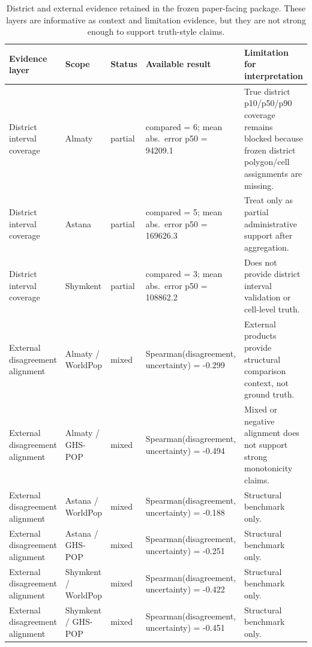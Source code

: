 \begin{table}[H]
\centering
\scriptsize
\caption{District and external evidence retained in the frozen paper-facing package. These layers are informative as context and limitation evidence, but they are not strong enough to support truth-style claims.}
\label{tab:district-external}
\begin{tabular}{p{2.6cm}p{2.2cm}p{1.2cm}p{3.1cm}p{5.1cm}}
\toprule
Evidence layer & Scope & Status & Available result & Limitation for interpretation \\
\midrule
District interval coverage & Almaty & partial & compared = 6; mean abs.\ error p50 = 94209.1 & True district p10/p50/p90 coverage remains blocked because frozen district polygon/cell assignments are missing. \\
District interval coverage & Astana & partial & compared = 5; mean abs.\ error p50 = 169626.3 & Treat only as partial administrative support after aggregation. \\
District interval coverage & Shymkent & partial & compared = 3; mean abs.\ error p50 = 108862.2 & Does not provide district interval validation or cell-level truth. \\
External disagreement alignment & Almaty / WorldPop & mixed & Spearman(disagreement, uncertainty) = -0.299 & External products provide structural comparison context, not ground truth. \\
External disagreement alignment & Almaty / GHS-POP & mixed & Spearman(disagreement, uncertainty) = -0.494 & Mixed or negative alignment does not support strong monotonicity claims. \\
External disagreement alignment & Astana / WorldPop & mixed & Spearman(disagreement, uncertainty) = -0.188 & Structural benchmark only. \\
External disagreement alignment & Astana / GHS-POP & mixed & Spearman(disagreement, uncertainty) = -0.251 & Structural benchmark only. \\
External disagreement alignment & Shymkent / WorldPop & mixed & Spearman(disagreement, uncertainty) = -0.422 & Structural benchmark only. \\
External disagreement alignment & Shymkent / GHS-POP & mixed & Spearman(disagreement, uncertainty) = -0.451 & Structural benchmark only. \\
\bottomrule
\end{tabular}
\end{table}

